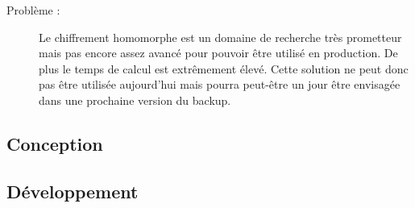 \documentclass[a4paper,10pt, twoside]{report}
\begin{document}
\begin{spacing}{1.2}
\begin{description}
 \item [Probl\`eme :] Le chiffrement homomorphe est un domaine de recherche
 tr\`es prometteur mais pas encore assez avanc\'e pour pouvoir \^etre utilis\'e
 en production. De plus le temps de calcul est extr\^emement \'elev\'e. Cette
 solution ne peut donc pas \^etre utilis\'ee aujourd'hui mais pourra peut-\^etre
 un jour \^etre envisag\'ee dans une prochaine version du backup.
\end{description}



\subsection{Conception}
\subsection{D\'eveloppement}

\newpage
\listoffigures
\listoftables



\end{spacing}
\end{document}
